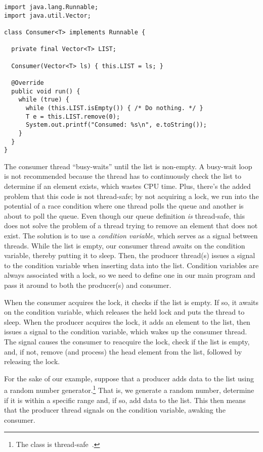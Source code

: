 \begin{lstlisting}[language=MyJava]
import java.lang.Runnable;
import java.util.Vector;

class Consumer<T> implements Runnable {

  private final Vector<T> LIST;

  Consumer(Vector<T> ls) { this.LIST = ls; }

  @Override
  public void run() {
    while (true) {
      while (this.LIST.isEmpty()) { /* Do nothing. */ }
      T e = this.LIST.remove(0);
      System.out.printf("Consumed: %s\n", e.toString());
    }
  }
}
\end{lstlisting}

The consumer thread ``busy-waits'' until the list is non-empty. 
A busy-wait loop is not recommended because the thread has to continuously check the list to determine if an element exists, which wastes CPU time. 
Plus, there's the added problem that this code is not thread-safe; by not acquiring a lock, we run into the potential of a race condition where one thread polls the queue and another is about to poll the queue. 
Even though our queue definition \emph{is} thread-safe, this does not solve the problem of a thread trying to remove an element that does not exist. 
The solution is to use a \emph{condition variable}, which serves as a signal between threads. 
While the list is empty, our consumer thread awaits on the condition variable, thereby putting it to sleep. 
Then, the producer thread(s) issues a signal to the condition variable when inserting data into the list. 
Condition variables are always associated with a lock, so we need to define one in our main program and pass it around to both the producer(s) and consumer. 

When the consumer acquires the lock, it checks if the list is empty. 
If so, it awaits on the condition variable, which releases the held lock and puts the thread to sleep. 
When the producer acquires the lock, it adds an element to the list, then issues a signal to the condition variable, which wakes up the consumer thread. 
The signal causes the consumer to reacquire the lock, check if the list is empty, and, if not, remove (and process) the head element from the list, followed by releasing the lock.

For the sake of our example, suppose that a producer adds data to the list using a random number generator.\footnote{The  class is thread-safe~.} 
That is, we generate a random number, determine if it is within a specific range and, if so, add data to the list. 
This then means that the producer thread signals on the condition variable, awaking the consumer.

